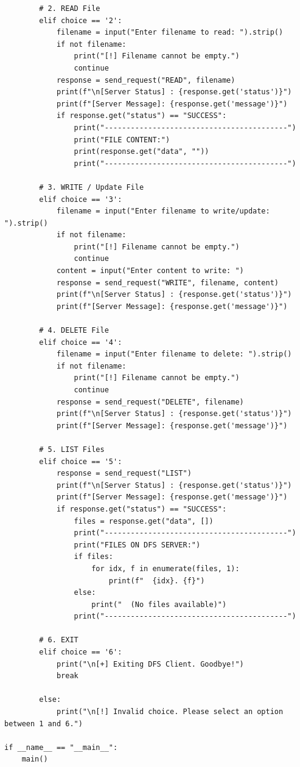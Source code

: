 \documentclass[main]{subfiles}
\begin{document}
\begin{verbatim}
        # 2. READ File
        elif choice == '2':
            filename = input("Enter filename to read: ").strip()
            if not filename:
                print("[!] Filename cannot be empty.")
                continue
            response = send_request("READ", filename)
            print(f"\n[Server Status] : {response.get('status')}")
            print(f"[Server Message]: {response.get('message')}")
            if response.get("status") == "SUCCESS":
                print("------------------------------------------")
                print("FILE CONTENT:")
                print(response.get("data", ""))
                print("------------------------------------------")

        # 3. WRITE / Update File
        elif choice == '3':
            filename = input("Enter filename to write/update: ").strip()
            if not filename:
                print("[!] Filename cannot be empty.")
                continue
            content = input("Enter content to write: ")
            response = send_request("WRITE", filename, content)
            print(f"\n[Server Status] : {response.get('status')}")
            print(f"[Server Message]: {response.get('message')}")

        # 4. DELETE File
        elif choice == '4':
            filename = input("Enter filename to delete: ").strip()
            if not filename:
                print("[!] Filename cannot be empty.")
                continue
            response = send_request("DELETE", filename)
            print(f"\n[Server Status] : {response.get('status')}")
            print(f"[Server Message]: {response.get('message')}")

        # 5. LIST Files
        elif choice == '5':
            response = send_request("LIST")
            print(f"\n[Server Status] : {response.get('status')}")
            print(f"[Server Message]: {response.get('message')}")
            if response.get("status") == "SUCCESS":
                files = response.get("data", [])
                print("------------------------------------------")
                print("FILES ON DFS SERVER:")
                if files:
                    for idx, f in enumerate(files, 1):
                        print(f"  {idx}. {f}")
                else:
                    print("  (No files available)")
                print("------------------------------------------")

        # 6. EXIT
        elif choice == '6':
            print("\n[+] Exiting DFS Client. Goodbye!")
            break

        else:
            print("\n[!] Invalid choice. Please select an option between 1 and 6.")

if __name__ == "__main__":
    main()
\end{verbatim}
\end{document}

